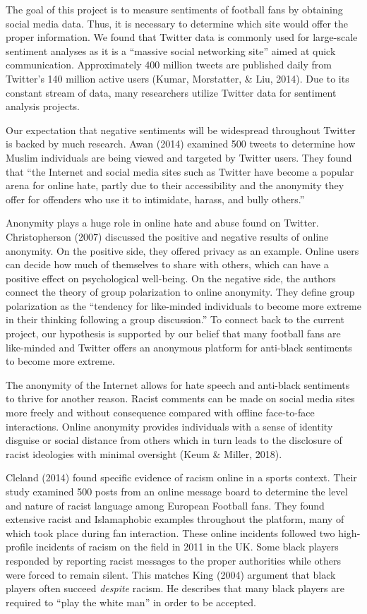 \documentclass[12pt,twoside]{reedthesis}
\begin{document}
The goal of this project is to measure sentiments of football fans by
obtaining social media data. Thus, it is necessary to determine which
site would offer the proper information. We found that Twitter data is
commonly used for large-scale sentiment analyses as it is a ``massive
social networking site'' aimed at quick communication. Approximately 400
million tweets are published daily from Twitter's 140 million active
users (Kumar, Morstatter, \& Liu, 2014). Due to its constant stream of
data, many researchers utilize Twitter data for sentiment analysis
projects.

Our expectation that negative sentiments will be widespread throughout
Twitter is backed by much research. Awan (2014) examined 500 tweets to
determine how Muslim individuals are being viewed and targeted by
Twitter users. They found that ``the Internet and social media sites
such as Twitter have become a popular arena for online hate, partly due
to their accessibility and the anonymity they offer for offenders who
use it to intimidate, harass, and bully others.''

Anonymity plays a huge role in online hate and abuse found on Twitter.
Christopherson (2007) discussed the positive and negative results of
online anonymity. On the positive side, they offered privacy as an
example. Online users can decide how much of themselves to share with
others, which can have a positive effect on psychological well-being. On
the negative side, the authors connect the theory of group polarization
to online anonymity. They define group polarization as the ``tendency
for like-minded individuals to become more extreme in their thinking
following a group discussion.'' To connect back to the current project,
our hypothesis is supported by our belief that many football fans are
like-minded and Twitter offers an anonymous platform for anti-black
sentiments to become more extreme.

The anonymity of the Internet allows for hate speech and anti-black
sentiments to thrive for another reason. Racist comments can be made on
social media sites more freely and without consequence compared with
offline face-to-face interactions. Online anonymity provides individuals
with a sense of identity disguise or social distance from others which
in turn leads to the disclosure of racist ideologies with minimal
oversight (Keum \& Miller, 2018).

Cleland (2014) found specific evidence of racism online in a sports
context. Their study examined 500 posts from an online message board to
determine the level and nature of racist language among European
Football fans. They found extensive racist and Islamaphobic examples
throughout the platform, many of which took place during fan
interaction. These online incidents followed two high-profile incidents
of racism on the field in 2011 in the UK. Some black players responded
by reporting racist messages to the proper authorities while others were
forced to remain silent. This matches King (2004) argument that black
players often succeed \emph{despite} racism. He describes that many
black players are required to ``play the white man'' in order to be
accepted.
\end{document}
